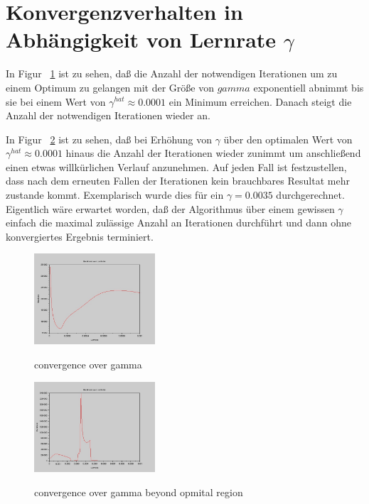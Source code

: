 \documentclass[]{report}
\begin{document}
\section{Konvergenzverhalten in Abh\"angigkeit von Lernrate $\gamma$}

In Figur ~\ref{fig:ConvergenceOverGamma} ist zu sehen, da{\ss} die Anzahl der notwendigen Iterationen um zu einem Optimum zu gelangen mit der Gr\"o{\ss}e von $gamma$ exponentiell abnimmt bis sie bei einem Wert von $\gamma^{hat} \approx 0.0001$ ein Minimum erreichen. Danach steigt die Anzahl der notwendigen Iterationen wieder an.

In Figur ~\ref{fig:ConvergenceOverGammaWDiverge} ist zu sehen, da{\ss} bei Erh\"ohung von $\gamma$ \"uber den optimalen Wert von $\gamma^{hat} \approx 0.0001$ hinaus die Anzahl der Iterationen wieder zunimmt um anschlie{\ss}end einen etwas willk\"urlichen Verlauf anzunehmen. Auf jeden Fall ist festzustellen, dass nach dem erneuten Fallen der Iterationen kein brauchbares Resultat mehr zustande kommt. Exemplarisch wurde dies f\"ur ein $\gamma=0.0035$ durchgerechnet. Eigentlich w\"are erwartet worden, da{\ss} der Algorithmus \"uber einem gewissen $\gamma$ einfach die maximal zul\"assige Anzahl an Iterationen durchf\"uhrt und dann ohne konvergiertes Ergebnis terminiert.

\begin{figure}[h]
\centering
\includegraphics[width=0.4\textwidth]{./images/ConvergenceOverGamma.jpg} \\
\caption{convergence over gamma}
\label{fig:ConvergenceOverGamma}
\end{figure}

\begin{figure}[h]
\centering
\includegraphics[width=0.4\textwidth]{./images/ConvergenceOverGamma_w_diverge.jpg} \\
\caption{convergence over gamma beyond opmital region}
\label{fig:ConvergenceOverGammaWDiverge}
\end{figure}
\end{document}
